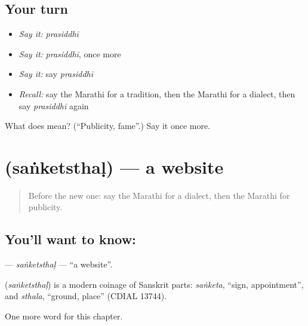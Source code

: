 \subsection*{Your turn}
\begin{itemize}
\raggedright
  \item \emph{Say it:} \emph{prasiddhī}
  \item \emph{Say it:} \emph{prasiddhī}, once more
  \item \emph{Say it:} say \emph{prasiddhī}
  \item \emph{Recall:} say the Marathi for a tradition, then the Marathi for a dialect, then say \emph{prasiddhī} again
\end{itemize}

\begin{tcolorbox}[breakable,colback=teal!4,colframe=teal!35!black,title={Before you move on}]
What does  mean? (\textquotedblleft{}Publicity, fame\textquotedblright{}.) Say it once more.
\end{tcolorbox}
\section[\texorpdfstring{\mr{संकेतस्थळ} (saṅketsthaḷ)}{संकेतस्थळ (saṅketsthaḷ)}]{ (saṅketsthaḷ) — a website}

\label{lesson:MR-C237-sanketsthal}



\begin{quote}
Before the new one: say the Marathi for a dialect, then the Marathi for publicity.
\end{quote}

\subsection*{You'll want to know: }
\textbf{} — \emph{saṅketsthaḷ} — \textquotedblleft{}a website\textquotedblright{}.

\begin{cousinweb}
\textbf{} (\emph{saṅketsthaḷ}) is a modern coinage of Sanskrit parts: \emph{saṅketa}, \textquotedblleft{}sign, appointment\textquotedblright{}, and \emph{sthala}, \textquotedblleft{}ground, place\textquotedblright{} (CDIAL 13744).
\end{cousinweb}

\begin{grammarlens}[title={What you've built}]
One more word for this chapter.
\end{grammarlens}

